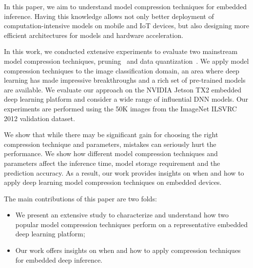 In this paper, we aim to understand model compression techniques for embedded inference. Having this knowledge allows not only better
deployment of computation-intensive models on mobile and IoT devices, but also designing more efficient architectures for models and
hardware acceleration.

In this work, we conducted extensive experiments to evaluate two mainstream model compression techniques, pruning~\cite{Li2016Pruning} and data
quantization~\cite{Gong2014Compressing}. We apply model compression techniques to the image classification domain, an area where deep learning has made
impressive breakthroughs and a rich set of pre-trained models are available. We evaluate our approach on the NVIDIA Jetson TX2 embedded
deep learning platform and consider a wide range of influential DNN models. Our experiments are performed using the 50K images from the
ImageNet ILSVRC 2012 validation dataset.

We show that while there may be significant gain for choosing the right compression technique and parameters, mistakes can seriously hurt
the performance. We show how different model compression techniques and parameters affect the inference time, model storage requirement and
the prediction accuracy. As a result, our work provides insights on when and how to apply deep learning model compression techniques on
embedded devices.

The main contributions of this paper are two folds:

\begin{itemize}
\item We present an extensive study to characterize and understand how two popular model compression techniques perform on a
    representative embedded deep learning platform;
\item Our work offers insights on when and how to apply compression techniques for embedded deep inference.
\end{itemize}
